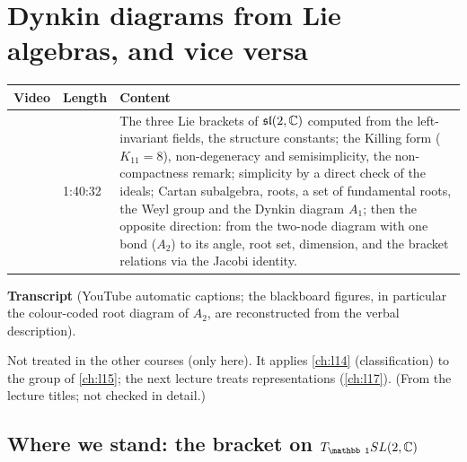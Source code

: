 \chapter{Dynkin diagrams from Lie algebras, and vice versa}\label{ch:l16}
\begin{paracol}{2}

\begin{sources}
\begin{tabularx}{\linewidth}{@{}l l L@{}}
\toprule
\textbf{Video} & \textbf{Length} & \textbf{Content}\\
\midrule
{} & 1:40:32 & The three Lie brackets of $\mathfrak{sl}(2,\mathbb{C})$ computed from the left-invariant fields, the structure constants; the Killing form ($K_{11}=8$), non-degeneracy and semisimplicity, the non-compactness remark; simplicity by a direct check of the ideals; Cartan subalgebra, roots, a set of fundamental roots, the Weyl group and the Dynkin diagram $A_1$; then the opposite direction: from the two-node diagram with one bond ($A_2$) to its angle, root set, dimension, and the bracket relations via the Jacobi identity.\\
\bottomrule
\end{tabularx}

\smallskip
\textbf{Transcript}  (YouTube automatic captions; the blackboard figures, in particular the colour-coded root diagram of $A_2$, are reconstructed from the verbal description).
\end{sources}

\begin{reading}
Not treated in the other courses (only here). It applies \cref{ch:l14} (classification) to the group of \cref{ch:l15}; the next lecture treats representations (\cref{ch:l17}). (From the lecture titles; not checked in detail.)
\end{reading}

\section{Where we stand: the bracket on $T_{\mathbb 1}SL(2,\C)$}\label{sec:sa-recap}


\end{paracol}
